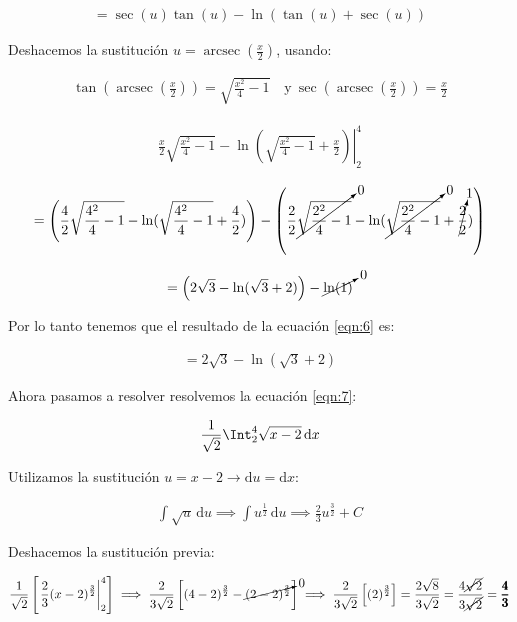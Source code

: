 \documentclass[12pt]{article}
\DeclareMathOperator{\arcsec}{arcsec}
\begin{document}
\begin{align*}
	= \sec(u)\tan(u) - \ln(\tan(u)+\sec(u))
\end{align*}

\noindent Deshacemos la sustitución $u = \arcsec(\frac{x}{2})$, usando:

\begin{align*}
	\tan\left(\arcsec\left(\frac{x}{2}\right)\right)=\sqrt{\frac{x^2}{4}-1}\quad \mathrm{y} \
	\sec\left(\arcsec\left(\frac{x}{2}\right)\right)=\frac{x}{2}
\end{align*}

\begin{align*}
	\left.\frac{x}{2}\sqrt{\frac{x^2}{4}-1}-\ln\left(\sqrt{\frac{x^2}{4}-1}+\frac{x}{2}\right)\right|_2^4
\end{align*}

\begin{align*}
	=\left(\frac{4}{2}\sqrt{\frac{4^2}{4}-1} - \ln(\sqrt{\frac{4^2}{4}-1}+\frac{4}{2})\right) - \left(\frac{2}{2}\cancelto{0}{\sqrt{\frac{2^2}{4}-1}} - \ln(\cancelto{0}{\sqrt{\frac{2^2}{4}-1}}+\cancelto{1}{\frac{2}{2}})\right)
\end{align*}

\begin{align*}
	=\left(2\sqrt{3} - \ln(\sqrt{3}+2)\right) - \cancelto{0}{\ln(1)}
\end{align*}

\noindent Por lo tanto tenemos que el resultado de la ecuación \eqref{eqn:6} es:

\begin{align*}
	=2\sqrt{3} - \ln(\sqrt{3}+2)
\end{align*}

\noindent Ahora pasamos a resolver resolvemos la ecuación \eqref{eqn:7}:

\begin{align*}
	\frac{1}{\sqrt{2}} \Int_2^4 \sqrt{x-2}\, \mathrm{d}x
\end{align*}

\noindent Utilizamos la sustitución $u=x-2 \to \mathrm{d}u = \mathrm{d}x$:

\begin{align*}
	\int \sqrt{u}\, \mathrm{d}u \implies \int u^{\frac{1}{2}}\, \mathrm{d}u \implies \frac{2}{3}u^{\frac{3}{2}} + C
\end{align*}

\noindent Deshacemos la sustitución previa:

\begin{align*}
	\frac{1}{\sqrt{2}}\left[\left.\frac{2}{3}(x-2)^{\frac{3}{2}}\right|_2^4\right] \implies \frac{2}{3\sqrt{2}} \left[(4-2)^{\frac{3}{2}} - \cancelto{0}{(2-2)^{\frac{3}{2}}}\right] \implies \frac{2}{3\sqrt{2}} \left[(2)^{\frac{3}{2}}\right] = \frac{2\sqrt{8}}{3\sqrt{2}} = \frac{4\cancel{\sqrt{2}}}{3\cancel{\sqrt{2}}} = \pmb{\frac{4}{3}}
\end{align*}
\end{document}
